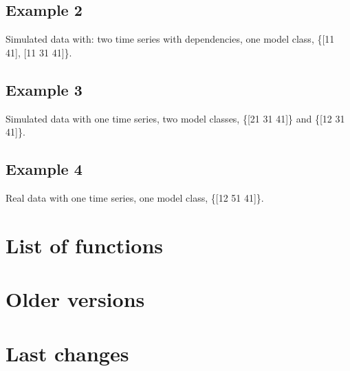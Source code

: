 \documentclass{book}
\begin{document}
\section{Example 2}
Simulated data with: two time series with dependencies, one model class, \{[11 41], [11 31 41]\}.

\section{Example 3}
Simulated data with one time series, two model classes, \{[21 31 41]\} and \{[12 31 41]\}.

\section{Example 4}
Real data with one time series, one model class, \{[12 51 41]\}.

\newpage

\chapter{List of functions}
\newpage


\chapter{Older versions}
\newpage

\chapter{Last changes}

\newpage
\end{document}
